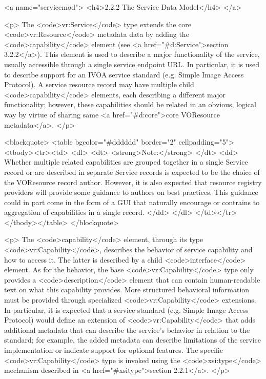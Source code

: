 \documentclass[11pt,a4paper]{ivoa}
\begin{document}
<a name="servicemod">
<h4>2.2.2 The Service Data Model</h4>
</a>

<p>
The <code>vr:Service</code> type extends the core
<code>vr:Resource</code> metadata data by adding the
<code>capability</code> element (see <a href="#d:Service">section
3.2.2</a>).  This element is used to describe a major functionality of
the service, usually accessible through a single service endpoint URL.
In particular, it is used to describe support for an IVOA service
standard (e.g. Simple Image Access Protocol).  A service resource
record may have multiple child <code>capability</code> elements, each
describing a different major functionality; however, these
capabilities should be related in an obvious, logical way by virtue of
sharing same <a href="#d:core">core VOResource metadata</a>.  
</p>

<blockquote>
<table bgcolor="#dddddd" border="2" cellpadding="5"><tbody><tr><td>
<dl>
  <dt> <strong>Note:</strong> </dt>
  <dd> Whether multiple related capabilities are grouped together in a
       single Service record or are described in separate Service
       records is expected to be the choice of the VOResource record
       author.  However, it is also expected that resource registry
       providers will provide some guidance to authors on best
       practices.  This guidance could in part come in the form of a
       GUI that naturally encourage or contrains to aggregation of
       capabilities in a single record.  </dd>
</dl>
</td></tr></tbody></table>
</blockquote>

<p>
The <code>capability</code> element, through its type
<code>vr:Capability</code>, describes the behavior of service
capability and how to access it.  The latter is described by a child
<code>interface</code> element.  As for the behavior, the base
<code>vr:Capability</code> type only provides a
<code>description</code> element that can contain human-readable text
on what this capability provides.  More structured behavioral
information must be provided through specialized
<code>vr:Capability</code> extensions.  In particular, it is expected
that a service standard (e.g. Simple Image Access Protocol) would
define an extension of <code>vr:Capability</code> that adds additional
metadata that can describe the service's behavior in relation to the
standard; for example, the added metadata can describe limitations of
the service implementation or indicate support for optional features.
The specific <code>vr:Capability</code> type is invoked using the
<code>xsi:type</code> mechanism described in
<a href="#xsitype">section 2.2.1</a>.   
</p>
\end{document}
